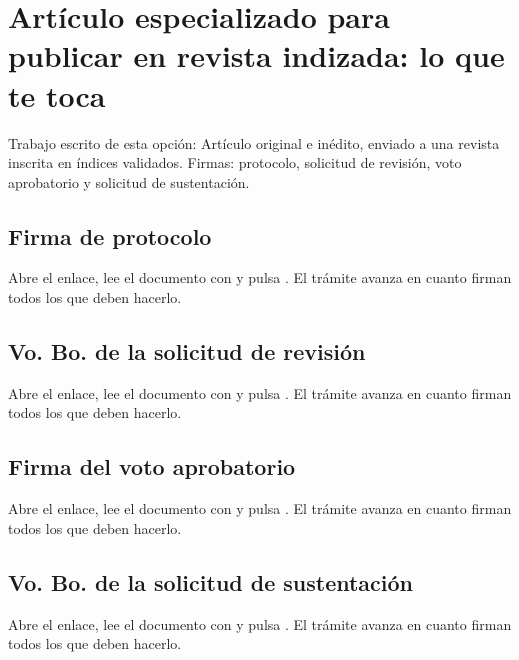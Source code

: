\section{Artículo especializado para publicar en revista indizada: lo que te toca}
Trabajo escrito de esta opción: Artículo original e inédito, enviado a una revista inscrita en índices validados. Firmas: protocolo, solicitud de revisión, voto aprobatorio y solicitud de sustentación.
\subsection{Firma de protocolo}
Abre el enlace, lee el documento con  y pulsa . El trámite avanza en cuanto firman todos los que deben hacerlo.
\subsection{Vo. Bo. de la solicitud de revisión}
Abre el enlace, lee el documento con  y pulsa . El trámite avanza en cuanto firman todos los que deben hacerlo.
\subsection{Firma del voto aprobatorio}
Abre el enlace, lee el documento con  y pulsa . El trámite avanza en cuanto firman todos los que deben hacerlo.
\subsection{Vo. Bo. de la solicitud de sustentación}
Abre el enlace, lee el documento con  y pulsa . El trámite avanza en cuanto firman todos los que deben hacerlo.
